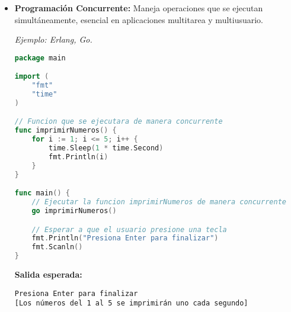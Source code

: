 \documentclass{report}
\begin{document}
\begin{itemize}
\item \textbf{Programación Concurrente:} Maneja operaciones que se ejecutan simultáneamente, esencial en aplicaciones multitarea y multiusuario. 

\textit{Ejemplo: Erlang, Go.}

\begin{minipage}{\linewidth} %
\begin{lstlisting}[language=Go, caption=Ejemplo de Programacion Concurrente en Go]
package main

import (
    "fmt"
    "time"
)

// Funcion que se ejecutara de manera concurrente
func imprimirNumeros() {
    for i := 1; i <= 5; i++ {
        time.Sleep(1 * time.Second)
        fmt.Println(i)
    }
}

func main() {
    // Ejecutar la funcion imprimirNumeros de manera concurrente
    go imprimirNumeros()

    // Esperar a que el usuario presione una tecla
    fmt.Println("Presiona Enter para finalizar")
    fmt.Scanln()
}
\end{lstlisting}

\textbf{Salida esperada:}
\begin{verbatim}
Presiona Enter para finalizar
[Los números del 1 al 5 se imprimirán uno cada segundo]
\end{verbatim}
\end{minipage} %

\end{itemize}
\end{document}
